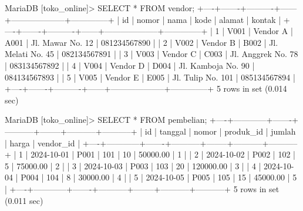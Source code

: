 MariaDB [toko_online]> SELECT * FROM vendor;
+----+-------+----------+------+--------------------+--------------+
| id | nomor | nama     | kode | alamat             | kontak       |
+----+-------+----------+------+--------------------+--------------+
|  1 | V001  | Vendor A | A001 | Jl. Mawar No. 12   | 081234567890 |
|  2 | V002  | Vendor B | B002 | Jl. Melati No. 45  | 082134567891 |
|  3 | V003  | Vendor C | C003 | Jl. Anggrek No. 78 | 083134567892 |
|  4 | V004  | Vendor D | D004 | Jl. Kamboja No. 90 | 084134567893 |
|  5 | V005  | Vendor E | E005 | Jl. Tulip No. 101  | 085134567894 |
+----+-------+----------+------+--------------------+--------------+
5 rows in set (0.014 sec)

MariaDB [toko_online]> SELECT * FROM pembelian;
+----+------------+-------+-----------+--------+-----------+-----------+
| id | tanggal    | nomor | produk_id | jumlah | harga     | vendor_id |
+----+------------+-------+-----------+--------+-----------+-----------+
|  1 | 2024-10-01 | P001  |       101 |     10 |  50000.00 |         1 |
|  2 | 2024-10-02 | P002  |       102 |      5 |  75000.00 |         2 |
|  3 | 2024-10-03 | P003  |       103 |     20 | 120000.00 |         3 |
|  4 | 2024-10-04 | P004  |       104 |      8 |  30000.00 |         4 |
|  5 | 2024-10-05 | P005  |       105 |     15 |  45000.00 |         5 |
+----+------------+-------+-----------+--------+-----------+-----------+
5 rows in set (0.011 sec)